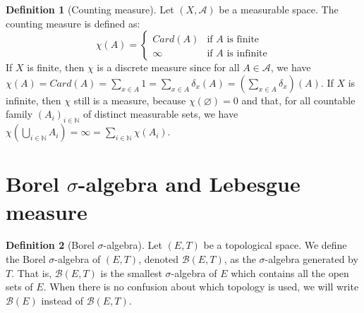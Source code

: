 \documentclass{article}
\newtheorem{theorem}{Theorem}[section]
\theoremstyle{definition}
\newtheorem{definition}{Definition}[section]
\theoremstyle{remark}
\theoremstyle{example}
\theoremstyle{notation}
\theoremstyle{axiom}
\newcommand{\tif}{\text{if }}
\begin{document}
\begin{definition}[Counting measure]
    Let $(X, \mathcal{A})$ be a measurable space. The counting measure is defined as:
        $$\chi(A) = \begin{cases}Card(A) & \tif A \text{ is finite}\\ \infty & \tif A \text{ is infinite}\end{cases}$$
		If $X$ is finite, then $\chi$ is a discrete measure since for all $A \in \mathcal{A}$, we have $\chi(A) = Card(A) = \sum_{x \in A} 1 = \sum_{x \in A} \delta_x(A) = \left(\sum_{x \in A} \delta_x\right)(A)$. If $X$ is infinite, then $\chi$ still is a measure, because $\chi(\varnothing)=0$ and that, for all countable family $(A_i)_{i \in \mathbb{N}}$ of distinct measurable sets, we have $\chi(\bigcup_{i\in\mathbb{N}} A_i) = \infty = \sum_{i\in\mathbb{N}} \chi(A_i)$.
\end{definition}


\section{Borel $\sigma$-algebra and Lebesgue measure}

\begin{definition}[Borel $\sigma$-algebra]
		Let $(E, T)$ be a topological space. We define the Borel $\sigma$-algebra of $(E, T)$, denoted $\mathcal{B}(E, T)$, as the $\sigma$-algebra generated by $T$. That is, $\mathcal{B}(E, T)$ is the smallest $\sigma$-algebra of $E$ which contains all the open sets of $E$. When there is no confusion about which topology is used, we will write $\mathcal{B}(E)$ instead of $\mathcal{B}(E, T)$. 
\end{definition}
\end{document}
